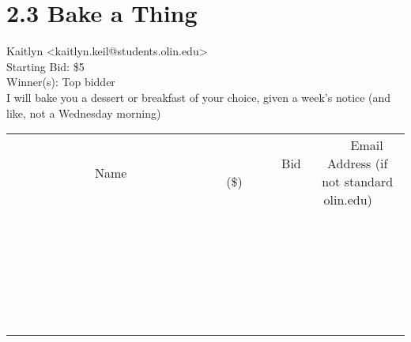 \documentclass[11pt]{article}
\begin{document}
					\section*{2.3 Bake a Thing}
					Kaitlyn <kaitlyn.keil@students.olin.edu> \\
					Starting Bid: \$5 \\
					Winner(s): Top bidder \\
					I will bake you a dessert or breakfast of your choice, given a week's notice (and like, not a Wednesday morning) \\
					[6ex]
					\begin{tabular}{c c c}
						~~~~~~~~~~~~~Name~~~~~~~~~~~~~ & ~~~~~~~~~Bid (\$)~~~~~~~~~ & ~~~Email Address (if not standard olin.edu)~~~ \\
				
 & & \\
\hline
 & & \\
\hline
 & & \\
\hline
 & & \\
\hline
 & & \\
\hline
 & & \\
\hline
 & & \\
\hline
 & & \\
\hline
 & & \\
\hline
 & & \\
\hline
 & & \\
\hline
 & & \\
\hline
 & & \\
\hline
 & & \\
\hline
 & & \\
\hline
 & & \\
\hline
 & & \\
\hline
 & & \\
\hline
 & & \\
\hline
 & & \\
\hline
 & & \\
\hline
 & & \\
\hline
 & & \\
\hline
 & & \\
\hline
 & & \\
\hline
 & & \\
\hline
					\end{tabular}
					\clearpage
				
\end{document}
